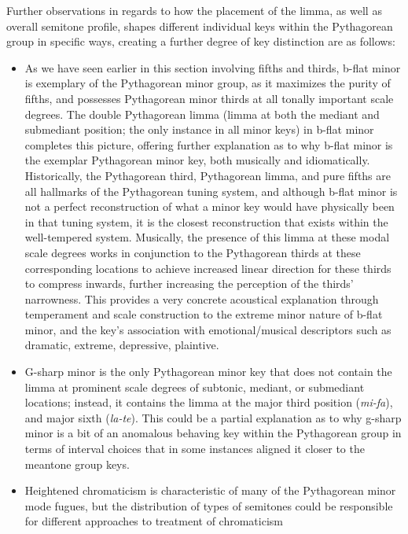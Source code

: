 Further observations in regards to how the placement of the limma, as
well as overall semitone profile, shapes different individual keys
within the Pythagorean group in specific ways, creating a further degree
of key distinction are as follows:

\begin{itemize}
\tightlist
\item
  As we have seen earlier in this section involving fifths and thirds,
  b-flat minor is exemplary of the Pythagorean minor group, as it
  maximizes the purity of fifths, and possesses Pythagorean minor thirds
  at all tonally important scale degrees. The double Pythagorean limma
  (limma at both the mediant and submediant position; the only instance
  in all minor keys) in b-flat minor completes this picture, offering
  further explanation as to why b-flat minor is the exemplar Pythagorean
  minor key, both musically and idiomatically. Historically, the
  Pythagorean third, Pythagorean limma, and pure fifths are all
  hallmarks of the Pythagorean tuning system, and although b-flat minor
  is not a perfect reconstruction of what a minor key would have
  physically been in that tuning system, it is the closest
  reconstruction that exists within the well-tempered system. Musically,
  the presence of this limma at these modal scale degrees works in
  conjunction to the Pythagorean thirds at these corresponding locations
  to achieve increased linear direction for these thirds to compress
  inwards, further increasing the perception of the thirds' narrowness.
  This provides a very concrete acoustical explanation through
  temperament and scale construction to the extreme minor nature of
  b-flat minor, and the key's association with emotional/musical
  descriptors such as dramatic, extreme, depressive, plaintive.
\item
  G-sharp minor is the only Pythagorean minor key that does not contain
  the limma at prominent scale degrees of subtonic, mediant, or
  submediant locations; instead, it contains the limma at the major
  third position (\emph{mi-fa}), and major sixth (\emph{la-te}). This
  could be a partial explanation as to why g-sharp minor is a bit of an
  anomalous behaving key within the Pythagorean group in terms of
  interval choices that in some instances aligned it closer to the
  meantone group keys.
\item
  Heightened chromaticism is characteristic of many of the Pythagorean
  minor mode fugues, but the distribution of types of semitones could be
  responsible for different approaches to treatment of chromaticism

\end{itemize}
